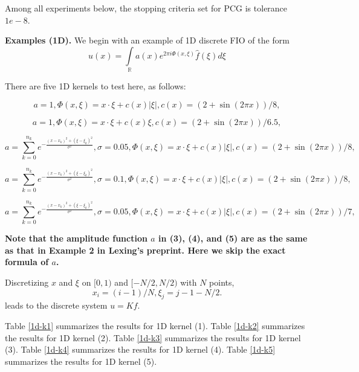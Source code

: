 \documentclass[11pt]{article}
\begin{document}
Among all experiments below, the stopping criteria set for PCG is tolerance $1e-8$.

\textbf{Examples (1D).} We begin with an example of 1D discrete FIO of the form
\begin{equation*}
u(x) = \int\limits_{\mathbb{R}}a(x)e^{2\pi i \Phi(x, \xi)}\hat{f}(\xi) d\xi
\end{equation*}


There are five 1D kernels to test here, as follows:

\begin{equation}
a = 1, \Phi(x,\xi) = x\cdot\xi + c(x)|\xi|, c(x) = (2+\sin(2\pi x))/8,
\end{equation}

\begin{equation}
a = 1, \Phi(x,\xi) = x\cdot\xi + c(x)\xi, c(x) = (2+\sin(2\pi x))/6.5,
\end{equation}

\begin{equation}
a = \sum\limits_{k=0}^{n_{k}} e^{-\frac{(x-x_{k})^2 + (\xi-\xi_{k})^2}{\sigma^2}}, \sigma = 0.05, \Phi(x,\xi) = x\cdot\xi + c(x)|\xi|, c(x) = (2+\sin(2\pi x))/8,
\end{equation}

\begin{equation}
a = \sum\limits_{k=0}^{n_{k}} e^{-\frac{(x-x_{k})^2 + (\xi-\xi_{k})^2}{\sigma^2}}, \sigma = 0.1, \Phi(x,\xi) = x\cdot\xi + c(x)|\xi|, c(x) = (2+\sin(2\pi x))/8,
\end{equation}

\begin{equation}
a = \sum\limits_{k=0}^{n_{k}} e^{-\frac{(x-x_{k})^2 + (\xi-\xi_{k})^2}{\sigma^2}}, \sigma = 0.05, \Phi(x,\xi) = x\cdot\xi + c(x)|\xi|, c(x) = (2+\sin(2\pi x))/7,
\end{equation}


\textbf{Note that the amplitude function $a$ in (3), (4), and (5) are as the same as that in Example 2 in Lexing's preprint. Here we skip the exact formula of $a$.}

Discretizing $x$ and $\xi$ on $[0,1)$ and $[-N/2, N/2)$ with $N$ points,
\begin{equation*}
x_{i} = (i-1)/N, \xi_{j} = j-1-N/2.
\end{equation*}
leads to the discrete system $u = Kf$.



Table \ref{1d-k1} summarizes the results for 1D kernel (1).
Table \ref{1d-k2} summarizes the results for 1D kernel (2).
Table \ref{1d-k3} summarizes the results for 1D kernel (3).
Table \ref{1d-k4} summarizes the results for 1D kernel (4).
Table \ref{1d-k5} summarizes the results for 1D kernel (5).
\end{document}
